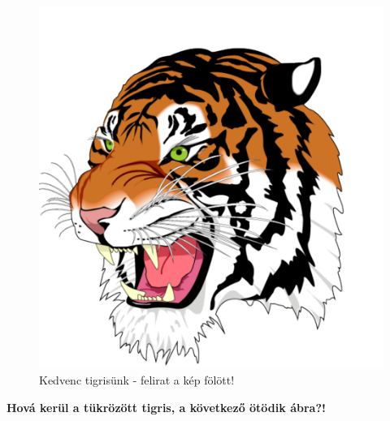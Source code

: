 \documentclass{article}
\begin{document}
\begin{figure}[h] %
\centering
\caption{Kedvenc tigrisünk - felirat a kép fölött!}
\includegraphics[scale=0.25]{tiger.pdf}
\end{figure}
%
\hulipsum[5-8]

\textbf{Hová kerül a tükrözött tigris, a következő ötödik ábra?!}
\end{document}
